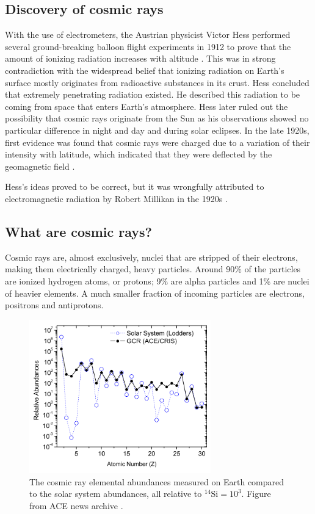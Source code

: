 \subsection{Discovery of cosmic rays}
With the use of electrometers, the Austrian physicist Victor Hess performed several ground-breaking balloon flight experiments in 1912 to prove that the amount of ionizing radiation increases with altitude \cite{hessnobel:1936}. This was in strong contradiction with the widespread belief that ionizing radiation on Earth's surface mostly originates from radioactive substances in its crust. Hess concluded that extremely penetrating radiation existed. He described this radiation to be coming from space that enters Earth's atmosphere.
Hess later ruled out the possibility that cosmic rays originate from the Sun as his observations showed no particular difference in night and day and during solar eclipses. In the late 1920s, first evidence was found that cosmic rays were charged due to a variation of their intensity with latitude, which indicated that they were deflected by the geomagnetic field \cite{clay:1927a}.

Hess's ideas proved to be correct, but it was wrongfully attributed to electromagnetic radiation by Robert Millikan in the 1920s \cite{PhysRev.32.533}. 

\subsection{What are cosmic rays?}
\label{subsec:whatarecosmicrays}
Cosmic rays are, almost exclusively, nuclei that are stripped of their electrons, making them electrically charged, heavy particles. Around 90\% of the particles are ionized hydrogen atoms, or protons; 9\% are alpha particles and 1\% are nuclei of heavier elements. A much smaller fraction of incoming particles are electrons, positrons and antiprotons.

\begin{figure}
\centering
\includegraphics[width=0.7\textwidth]{./chapter3/img/relativeabundanceACE.png}
\caption{The cosmic ray elemental abundances measured on Earth compared to the solar system abundances, all relative to ${}^{14}\textrm{Si} = 10^3$. Figure from ACE news archive \cite{ISRAEL2005201}.}
\label{fig:relabundance}
\end{figure}


